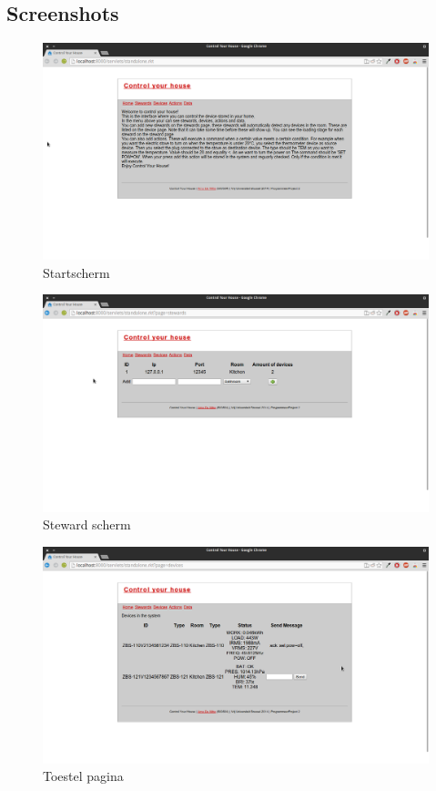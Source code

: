 \documentclass{article}
\begin{document}
\subsection{Screenshots}
\label{sub:screenshots}
\begin{figure}[htp]
\centering
\includegraphics[scale=0.30]{Screenshot1.png}
\caption{Startscherm}
\label{screen1}
\end{figure}
\begin{figure}[htp]
\centering
\includegraphics[scale=0.30]{Screenshot2.png}
\caption{Steward scherm}
\label{screen2}
\end{figure}
\begin{figure}[htp]
\centering
\includegraphics[scale=0.30]{Screenshot3.png}
\caption{Toestel pagina}
\label{screen3}
\end{figure}
\end{document}
